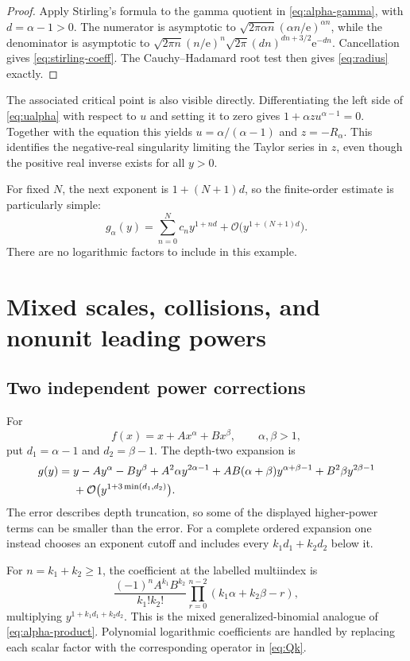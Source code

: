 \documentclass[11pt,a4paper]{article}
\theoremstyle{definition}
\theoremstyle{remark}
\newcommand{\OO}{\mathcal O}
\newcommand{\ee}{\mathrm e}
\begin{document}
\begin{proof}
Apply Stirling's formula to the gamma quotient in
\eqref{eq:alpha-gamma}, with $d=\alpha-1>0$. The numerator is asymptotic to
$\sqrt{2\pi\alpha n}(\alpha n/\ee)^{\alpha n}$, while the denominator is
asymptotic to
$\sqrt{2\pi n}(n/\ee)^n\sqrt{2\pi}(dn)^{dn+3/2}\ee^{-dn}$.
Cancellation gives \eqref{eq:stirling-coeff}. The Cauchy--Hadamard root test
then gives \eqref{eq:radius} exactly.
\end{proof}

The associated critical point is also visible directly. Differentiating the
left side of \eqref{eq:ualpha} with respect to $u$ and setting it to zero gives
$1+\alpha zu^{\alpha-1}=0$. Together with the equation this yields
$u=\alpha/(\alpha-1)$ and $z=-R_\alpha$. This identifies the negative-real
singularity limiting the Taylor series in $z$, even though the positive real
inverse exists for all $y>0$.

For fixed $N$, the next exponent is $1+(N+1)d$, so the finite-order estimate is
particularly simple:
\[
 g_\alpha(y)=\sum_{n=0}^Nc_n y^{1+nd}
                +\OO\bigl(y^{1+(N+1)d}\bigr).
\]
There are no logarithmic factors to include in this example.

\section{Mixed scales, collisions, and nonunit leading powers}
\label{sec:examples}

\subsection{Two independent power corrections}

For
\[
 f(x)=x+A x^\alpha+B x^\beta,\qquad \alpha,\beta>1,
\]
put $d_1=\alpha-1$ and $d_2=\beta-1$. The depth-two expansion is
\begin{align}
 g(y)={}&y-Ay^\alpha-By^\beta
 +A^2\alpha y^{2\alpha-1}
 +AB(\alpha+\beta)y^{\alpha+\beta-1}
 +B^2\beta y^{2\beta-1}\notag\\
 &+\OO\bigl(y^{1+3\min(d_1,d_2)}\bigr).
 \label{eq:mixedpowers}
\end{align}
The error describes depth truncation, so some of the displayed higher-power
terms can be smaller than the error. For a complete ordered expansion one
instead chooses an exponent cutoff and includes every $k_1d_1+k_2d_2$ below it.

For $n=k_1+k_2\ge1$, the coefficient at the labelled multiindex is
\[
 \frac{(-1)^nA^{k_1}B^{k_2}}{k_1!k_2!}
 \prod_{r=0}^{n-2}(k_1\alpha+k_2\beta-r),
\]
multiplying $y^{1+k_1d_1+k_2d_2}$. This is the mixed generalized-binomial
analogue of \eqref{eq:alpha-product}. Polynomial logarithmic coefficients are
handled by replacing each scalar factor with the corresponding operator in
\eqref{eq:Qk}.
\end{document}
